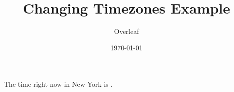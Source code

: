 \documentclass{article}
\title{Changing Timezones Example}
\author{Overleaf}
\date{\today}
\begin{document}
\maketitle

The time right now in New York is \DTMcurrenttime.
\end{document}

